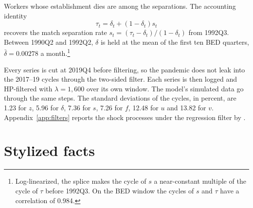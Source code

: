 \documentclass[authoryear, review, 12pt]{elsarticle}
\begin{document}
Workers whose establishment dies are among the separations. The accounting identity
\begin{equation}
\tau_t = \delta_t + (1-\delta_t)s_t
\end{equation}
recovers the match separation rate $s_t=(\tau_t-\delta_t)/(1-\delta_t)$ from 1992Q3. Between 1990Q2 and 1992Q2, $\delta$ is held at the mean of the first ten BED quarters, $\bar\delta=0.00278$ a month.\footnote{Log-linearized, the splice makes the cycle of $s$ a near-constant multiple of the cycle of $\tau$ before 1992Q3. On the BED window the cycles of $s$ and $\tau$ have a correlation of 0.984.}

 Every series is cut at 2019Q4 before filtering, so the pandemic does not leak into the 2017--19 cycles through the two-sided filter. Each series is then logged and HP-filtered with $\lambda=1{,}600$ over its own window. The model's simulated data go through the same steps. The standard deviations of the cycles, in percent, are 1.23 for $z$, 5.96 for $\delta$, 7.36 for $s$, 7.26 for $f$, 12.48 for $u$ and 13.82 for $v$. %
Appendix~\ref{app:filters} reports the shock processes under the regression filter by \citet{hamilton_2018}.

\section{Stylized facts}\label{sec:stylized}
\end{document}
